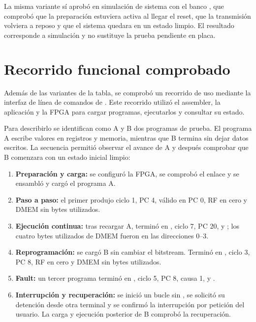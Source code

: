 La misma variante sí aprobó en simulación de sistema con el banco
, que comprobó que la preparación estuviera activa
al llegar el reset, que la transmisión volviera a reposo y que el sistema
quedara en un estado limpio. El resultado corresponde a simulación y no
sustituye la prueba pendiente en placa.

\section{Recorrido funcional comprobado}

Además de las variantes de la tabla, se comprobó un recorrido de uso mediante
la interfaz de línea de comandos de . Este recorrido utilizó el
assembler, la aplicación y la FPGA para cargar programas, ejecutarlos y
consultar su estado.

Para describirlo se identifican como A y B dos programas de prueba. El programa
A escribe valores en registros y memoria, mientras que B termina sin dejar
datos escritos. La secuencia permitió observar el avance de A y después
comprobar que B comenzara con un estado inicial limpio:

\begin{enumerate}
  \item \textbf{Preparación y carga:} se configuró la FPGA, se comprobó el
    enlace y se ensambló y cargó el programa A.
  \item \textbf{Paso a paso:} el primer  produjo ciclo 1, PC 4,
     válido en PC 0, RF en cero y DMEM sin bytes utilizados.
  \item \textbf{Ejecución continua:} tras recargar A,  terminó en
    , ciclo 7, PC 20,  y ; los cuatro
    bytes utilizados de DMEM fueron  en las direcciones 0--3.
  \item \textbf{Reprogramación:} se cargó B sin cambiar el bitstream. Terminó en
    , ciclo 3, PC 8, RF en cero y DMEM sin bytes utilizados.
  \item \textbf{Fault:} un tercer programa terminó en , ciclo 5,
    PC 8, causa 1,  y .
  \item \textbf{Interrupción y recuperación:} se inició un bucle sin
    , se solicitó su detención desde otra terminal y se confirmó
    la interrupción por petición del usuario. La carga y ejecución posterior
    de B comprobó la recuperación.
\end{enumerate}

